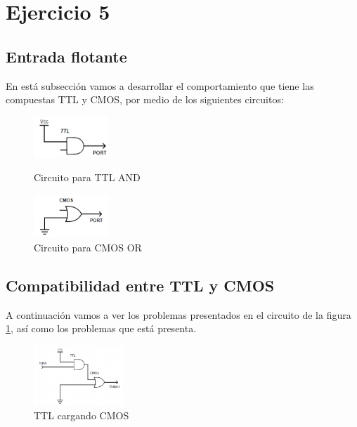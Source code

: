 \section{Ejercicio 5}

\subsection{Entrada flotante}
En está subsección vamos a desarrollar el comportamiento que tiene las compuestas TTL y CMOS, por medio de los siguientes circuitos:

\begin{figure}[H]
	\centering
	\begin{minipage}{0.4\textwidth}
    		\centering
		\includegraphics[width=0.25\textwidth]{Ejercicio5/TTL.png}
		\caption{Circuito para TTL AND}
	\end{minipage}
	\hspace{5mm}
	\begin{minipage}{0.4\textwidth}
		\centering
		\includegraphics[width=0.25\textwidth]{Ejercicio5/CMOS.png}
		\caption{Circuito para CMOS OR}
	\end{minipage}
\end{figure}


\subsection{Compatibilidad entre TTL y CMOS}
A continuación vamos a ver los problemas presentados en el circuito de la figura \ref{fig:eje5_1}, así como los problemas que está presenta.

\begin{figure}[H]
	\centering
	\includegraphics[width=0.3\textwidth]{Ejercicio5/TTL_CMOS.png}
	\caption{TTL cargando CMOS}
	\label{fig:eje5_1}
\end{figure}

